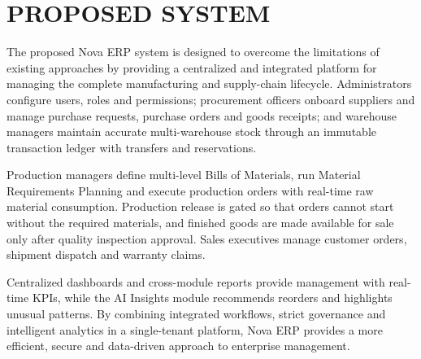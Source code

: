 \documentclass[12pt,a4paper]{report}
\begin{document}
\section{PROPOSED SYSTEM}
The proposed Nova ERP system is designed to overcome the limitations of existing approaches by providing a centralized and integrated platform for managing the complete manufacturing and supply-chain lifecycle. Administrators configure users, roles and permissions; procurement officers onboard suppliers and manage purchase requests, purchase orders and goods receipts; and warehouse managers maintain accurate multi-warehouse stock through an immutable transaction ledger with transfers and reservations.

Production managers define multi-level Bills of Materials, run Material Requirements Planning and execute production orders with real-time raw material consumption. Production release is gated so that orders cannot start without the required materials, and finished goods are made available for sale only after quality inspection approval. Sales executives manage customer orders, shipment dispatch and warranty claims.

Centralized dashboards and cross-module reports provide management with real-time KPIs, while the AI Insights module recommends reorders and highlights unusual patterns. By combining integrated workflows, strict governance and intelligent analytics in a single-tenant platform, Nova ERP provides a more efficient, secure and data-driven approach to enterprise management.
\end{document}
